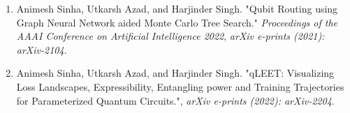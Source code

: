 \begin{enumerate}
    \item Animesh Sinha, Utkarsh Azad, and Harjinder Singh. "Qubit Routing using Graph Neural Network aided Monte Carlo Tree Search." \textit{Proceedings of the AAAI Conference on Artificial Intelligence 2022}, \textit{arXiv e-prints (2021): arXiv-2104}.
    \item Animesh Sinha, Utkarsh Azad, and Harjinder Singh. "qLEET: Visualizing Loss Landscapes, Expressibility, Entangling power and Training Trajectories for Parameterized Quantum Circuits.", \textit{arXiv e-prints (2022): arXiv-2204}.
\end{enumerate}

